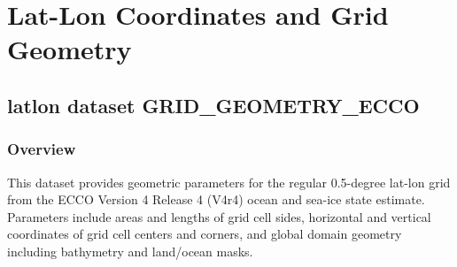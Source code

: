 \section{Lat-Lon Coordinates and Grid Geometry}
\subsection{latlon dataset GRID\_GEOMETRY\_ECCO}
\newp
\subsubsection{Overview}
This dataset provides geometric parameters for the regular 0.5-degree lat-lon grid from the ECCO Version 4 Release 4 (V4r4) ocean and sea-ice state estimate. Parameters include areas and lengths of grid cell sides, horizontal and vertical coordinates of grid cell centers and corners, and global domain geometry including bathymetry and land/ocean masks.
\\\\
